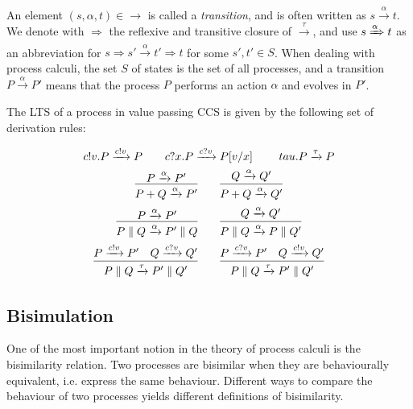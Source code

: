 An element $(s, \alpha, t) \in \rightarrow$ is called a \textit{transition}, and is often written as $s \xrightarrow{\alpha} t$. We denote with $\Rightarrow$ the reflexive and transitive closure of $\xrightarrow{\tau}$, and use $s \xRightarrow{\alpha} t$ as an abbreviation for $s \Rightarrow s' \xrightarrow{\alpha} t' \Rightarrow t$ for some $s', t' \in S$. When dealing with process calculi, the set $S$ of states is the set of all processes, and a transition $P \xrightarrow{\alpha} P'$ means that the process $P$ performs an action $\alpha$ and evolves in $P'$.

The LTS of a process in value passing CCS is given by the following set of derivation rules: 

\begin{gather*}
c!v.P \xrightarrow{c!v} P \qquad c?x.P \xrightarrow{c?v} P[v/x] \qquad \	tau.P \xrightarrow{\tau} P
\\
\infer{P + Q \xrightarrow{\alpha} P'}{P \xrightarrow{\alpha} P'} \qquad \infer{P + Q \xrightarrow{\alpha} Q'}{Q \xrightarrow{\alpha} Q'} 
\\
\infer{P \parallel Q \xrightarrow{\alpha} P'\parallel Q}{P \xrightarrow{\alpha} P'} \qquad \infer{P \parallel Q \xrightarrow{\alpha} P\parallel Q'}{Q \xrightarrow{\alpha} Q'} 
\\
\infer{P \parallel Q \xrightarrow{\tau} P'\parallel Q'}{P \xrightarrow{c!v} P' & Q \xrightarrow{c?v} Q' } \qquad
\infer{P \parallel Q \xrightarrow{\tau} P'\parallel Q'}{P \xrightarrow{c?v} P' & Q \xrightarrow{c!v} Q' } 
\\
\end{gather*}

\subsection{Bisimulation}

One of the most important notion in the theory of process calculi is the bisimilarity relation. Two processes are bisimilar when they are behaviourally equivalent, i.e. express the same behaviour. Different ways to compare the behaviour of two processes yields different definitions of bisimilarity.

